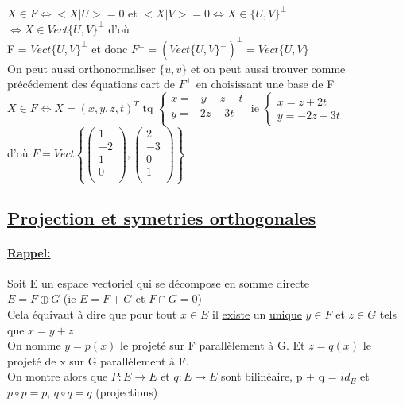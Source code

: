 \documentclass{article}
\newcommand\tab[1][1cm]{\hspace*{#1}}
\begin{document}
$X \in F \Leftrightarrow <X|U> = 0 \mbox{ et } <X|V> = 0 \Leftrightarrow X \in \{U, V\}^\perp$\\
\tab[1.5cm] $\Leftrightarrow X \in Vect\{U, V\}^\perp$ d'où\\
F = $Vect\{U, V\}^\perp$ et donc $F^\perp = (Vect\{U, V\}^\perp)^\perp = Vect\{U, V\}$\\
On peut aussi orthonormaliser $\{u, v\}$ et on peut aussi trouver comme précédement des équations cart de $F^\perp$ en choisissant une base de F\\
$X \in F \Leftrightarrow X = (x, y, z, t)^T \mbox{ tq } \left\{
    \begin{matrix}
        x = -y -z -t\\
        y = -2z -3t\\
    \end{matrix}
\right.  \mbox{ ie } \left\{
    \begin{matrix}
        x = z + 2t\\
        y = -2z - 3t
    \end{matrix}
\right.$\\
d'où $F = Vect\left\{
    \begin{pmatrix}
        1\\
        -2\\
        1\\
        0\\
    \end{pmatrix}, \begin{pmatrix}
        2\\
        -3\\
        0\\
        1\\
    \end{pmatrix}
\right\}$

\newpage

\subsection{\underline{Projection et symetries orthogonales}}

\paragraph{\underline{Rappel:}} 
Soit E un espace vectoriel qui se décompose en somme directe\\
$E = F \oplus G$ (ie $E = F + G$ et $F \cap G = 0$)\\
Cela équivaut à dire que pour tout $x \in E$ il \underline{existe} un \underline{unique} $y \in F$ et $z \in G$ tels que $x = y + z$\\
On nomme $y = p(x)$ le projeté sur F parallèlement à G. Et $z = q(x)$ le projeté de x sur G parallèlement à F.\\
On montre alors que $P : E \rightarrow E$ et $q : E \rightarrow E$ sont bilinéaire, p + q = $id_E$ et $p \circ p = p$, $q \circ q = q$ (projections)\\
\end{document}
